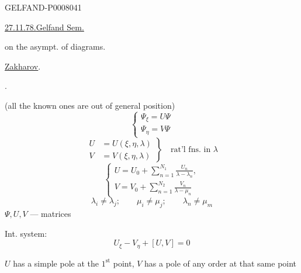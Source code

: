 \begin{GelfandAdjacentEvidence}{GELFAND-P000804}{1}

\underline{\underline{27.11.78.}}\qquad\underline{Gelfand Sem.}


on the asympt. of diagrams.

\underline{\underline{Zakharov}}.

.

(all the known ones are out of general position)
\begin{equation*}
\begin{cases}
\Psi_\xi=U\Psi\\
\Psi_\eta=V\Psi
\end{cases}
\tag{1}
\end{equation*}
\[
\left.\begin{aligned}
U&=U(\xi,\eta,\lambda)\\
V&=V(\xi,\eta,\lambda)
\end{aligned}\right\}\quad\text{rat’l fns. in }\lambda
\]
\begin{equation*}
\begin{cases}
\displaystyle U=U_0+\sum_{n=1}^{N_1}\frac{U_n}{\lambda-\lambda_n},\\[1ex]
\displaystyle V=V_0+\sum_{n=1}^{N_2}\frac{V_n}{\lambda-\mu_n}
\end{cases}
\tag{2}
\end{equation*}
\[
\lambda_i\ne\lambda_j;\qquad\mu_i\ne\mu_j;\qquad\lambda_n\ne\mu_m
\]
\(\Psi,U,V\) --- matrices

Int. system:
\begin{equation*}
U_\xi-V_\eta+[U,V]=0
\tag{3}
\end{equation*}
\end{GelfandAdjacentEvidence}


 \(U\) has a simple pole at the \(1^{\text{st}}\) point,
\(V\) has a pole of any order at that same point


